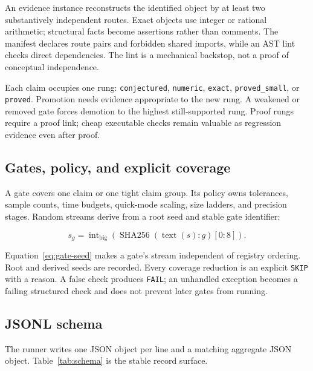 \documentclass[11pt]{article}
\newcommand{\code}[1]{\texttt{#1}}
\begin{document}
An evidence instance reconstructs the identified object by at least two
substantively independent routes.  Exact objects use integer or rational
arithmetic; structural facts become assertions rather than comments.  The
manifest declares route pairs and forbidden shared imports, while an AST lint
checks direct dependencies.  The lint is a mechanical backstop, not a proof
of conceptual independence.

Each claim occupies one rung:
\code{conjectured}, \code{numeric}, \code{exact},
\code{proved\_small}, or \code{proved}.  Promotion needs evidence appropriate
to the new rung.  A weakened or removed gate forces demotion to the highest
still-supported rung.  Proof rungs require a proof link; cheap executable
checks remain valuable as regression evidence even after proof.

\subsection{Gates, policy, and explicit coverage}

A gate covers one claim or one tight claim group.  Its policy owns tolerances,
sample counts, time budgets, quick-mode scaling, size ladders, and precision
stages.  Random streams derive from a root seed and stable gate identifier:

\begin{equation}
s_g=\operatorname{int}_{\mathrm{big}}
\left(\operatorname{SHA256}(\operatorname{text}(s)\mathbin{:}g)[0{:}8]\right).
\label{eq:gate-seed}
\end{equation}

Equation~\ref{eq:gate-seed} makes a gate's stream independent of registry
ordering.  Root and derived seeds are recorded.  Every coverage reduction is
an explicit \code{SKIP} with a reason.  A false check produces
\code{FAIL}; an unhandled exception becomes a failing structured check and
does not prevent later gates from running.

\subsection{JSONL schema}

The runner writes one JSON object per line and a matching aggregate JSON
object.  Table~\ref{tab:schema} is the stable record surface.
\end{document}
